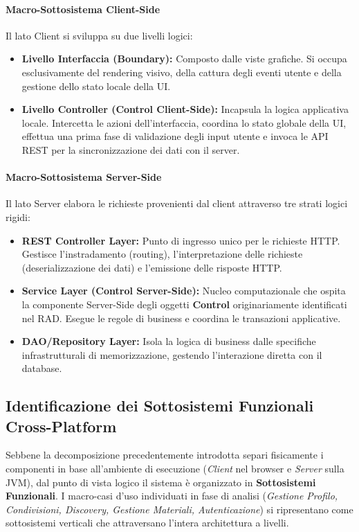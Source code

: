 \paragraph{Macro-Sottosistema Client-Side}
Il lato Client si sviluppa su due livelli logici:
\begin{itemize}
    \item \textbf{Livello Interfaccia (Boundary):} Composto dalle viste grafiche. Si occupa esclusivamente del rendering visivo, della cattura degli eventi utente e della gestione dello stato locale della UI.
    \item \textbf{Livello Controller (Control Client-Side):} Incapsula la logica applicativa locale. Intercetta le azioni dell'interfaccia, coordina lo stato globale della UI, effettua una prima fase di validazione degli input utente e invoca le API REST per la sincronizzazione dei dati con il server.
\end{itemize}

\paragraph{Macro-Sottosistema Server-Side}
Il lato Server elabora le richieste provenienti dal client attraverso tre strati logici rigidi:
\begin{itemize}
    \item \textbf{REST Controller Layer:} Punto di ingresso unico per le richieste HTTP. Gestisce l'instradamento (routing), l'interpretazione delle richieste (deserializzazione dei dati) e l'emissione delle risposte HTTP.
    \item \textbf{Service Layer (Control Server-Side):} Nucleo computazionale che ospita la componente Server-Side degli oggetti \textbf{Control} originariamente identificati nel RAD. Esegue le regole di business e coordina le transazioni applicative.
    \item \textbf{DAO/Repository Layer:} Isola la logica di business dalle specifiche infrastrutturali di memorizzazione, gestendo l'interazione diretta con il database.
\end{itemize}

\subsection{Identificazione dei Sottosistemi Funzionali Cross-Platform}
Sebbene la decomposizione precedentemente introdotta separi fisicamente i componenti in base all'ambiente di esecuzione (\textit{Client} nel browser e \textit{Server} sulla JVM), dal punto di vista logico il sistema è organizzato in \textbf{Sottosistemi Funzionali}. I macro-casi d'uso individuati in fase di analisi (\textit{Gestione Profilo, Condivisioni, Discovery, Gestione Materiali, Autenticazione}) si ripresentano come sottosistemi verticali che attraversano l'intera architettura a livelli.

